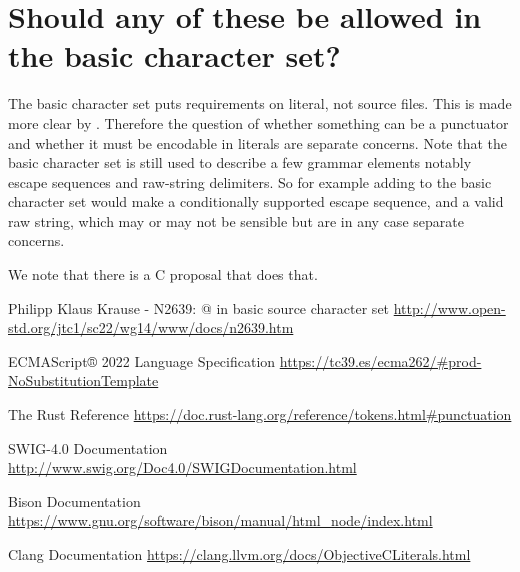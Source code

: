 \documentclass{wg21}
\begin{document}
    \section{Should any of these be allowed in the basic character set?}
    
    The basic character set puts requirements on literal, not source files. This is made more clear by .
    Therefore the question of whether something can be a punctuator and whether it must be encodable in literals are separate concerns.
    Note that the basic character set is still used to describe a few grammar elements notably escape sequences and raw-string delimiters.
    So for example adding \tcode{\$} to the basic character set would make  a conditionally supported escape sequence,
    and  a valid raw string, which may or may not be sensible but are in any case separate concerns.
    
    We note that there is a C proposal \cite{CN2639} that does that.
    
    
    
    
    
    
    
    \renewcommand{\section}[2]{}%
    \begin{thebibliography}{9}
        \nocite{N4830}
        
        Philipp Klaus Krause - N2639: @ in basic source character set
        \url{http://www.open-std.org/jtc1/sc22/wg14/www/docs/n2639.htm}
        
        ECMAScript® 2022 Language Specification
        \url{https://tc39.es/ecma262/#prod-NoSubstitutionTemplate}
        
        The Rust Reference
        \url{https://doc.rust-lang.org/reference/tokens.html#punctuation}
        
        SWIG-4.0 Documentation
        \url{http://www.swig.org/Doc4.0/SWIGDocumentation.html}
        
        Bison Documentation
        \url{https://www.gnu.org/software/bison/manual/html_node/index.html}
        
        Clang Documentation
        \url{https://clang.llvm.org/docs/ObjectiveCLiterals.html}
        
    \end{thebibliography}    
\end{document}
